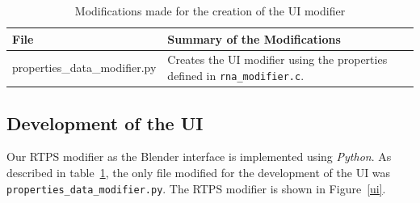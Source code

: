 \begin{table}[htdp]
\caption{Modifications made for the creation of the UI modifier}
\begin{center}
\begin{tabular}{|p{6cm}|p{6cm}|}
\hline 
\textbf{File} & \textbf{Summary of the Modifications} \\\hline 
properties\_data\_modifier.py & Creates the UI modifier using the properties defined in \texttt{rna\_modifier.c}. \\
\hline 
\end{tabular}
\end{center}
\label{uiTable}
\end{table}

\subsection{Development of the UI}
Our RTPS modifier as the Blender interface is implemented using \textit{Python}. As described in table~\ref{uiTable}, the only file modified for the development of the UI was \texttt{properties\_data\_modifier.py}. The RTPS modifier is shown in Figure~\ref{ui}.

